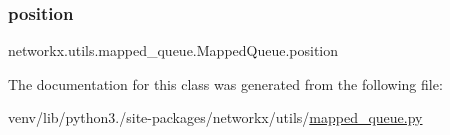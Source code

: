 \subsubsection{\texorpdfstring{position}{position}}
{\footnotesize\ttfamily networkx.\+utils.\+mapped\+\_\+queue.\+Mapped\+Queue.\+position}



The documentation for this class was generated from the following file\+:\begin{DoxyCompactItemize}
\item 
venv/lib/python3./site-\/packages/networkx/utils/\hyperlink{mapped__queue_8py}{mapped\+\_\+queue.\+py}\end{DoxyCompactItemize}

